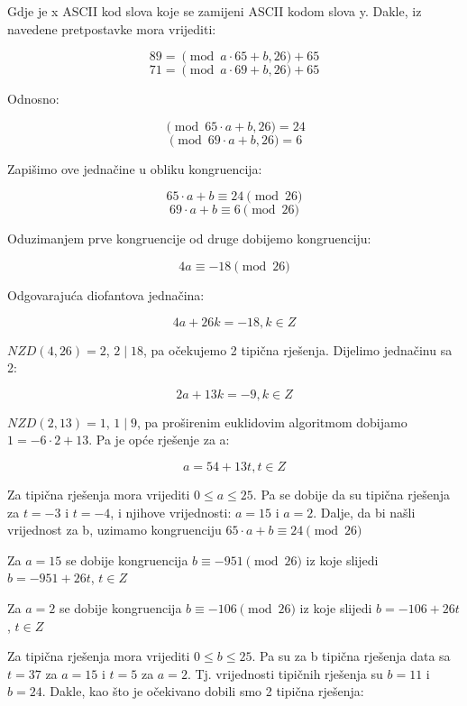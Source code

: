 \documentclass[12pt]{article}
\begin{document}
Gdje je x ASCII kod slova koje se zamijeni ASCII kodom slova y. Dakle, iz navedene pretpostavke mora vrijediti:

$$89 = \pmod{a\cdot65 + b, 26} + 65$$ 
$$71 = \pmod{a\cdot69 + b, 26} + 65$$

Odnosno:

$$\pmod{65\cdot a + b, 26} = 24$$
$$\pmod{69\cdot a + b, 26} = 6$$\vspace{1mm}

Zapišimo ove jednačine u obliku kongruencija:

$$65\cdot a + b \equiv 24 \pmod{26}$$
$$69\cdot a + b \equiv 6 \pmod{26}$$\vspace{1mm}

Oduzimanjem prve kongruencije od druge dobijemo kongruenciju:

$$4a \equiv -18\pmod{26}$$\vspace{1mm}

Odgovarajuća diofantova jednačina:

$$4a + 26k = -18, k \in Z$$\vspace{1mm} 

$NZD(4, 26) = 2$, $2 \mid 18$, pa očekujemo 2 tipična rješenja. Dijelimo jednačinu sa 2:

$$2a + 13k = -9, k \in Z$$\vspace{1mm}

$NZD(2, 13) = 1$, $1 \mid 9$, pa proširenim euklidovim algoritmom dobijamo $1 = -6\cdot 2 + 13$. Pa je opće rješenje za a:

$$a = 54 + 13t, t \in Z$$\vspace{1mm}

Za tipična rješenja mora vrijediti $0 \leq a \leq 25$. Pa se dobije da su tipična rješenja za $t = -3$ i $t = -4$, i njihove vrijednosti: $a = 15$ i $a = 2$.
Dalje, da bi našli vrijednost za b, uzimamo kongruenciju $65\cdot a + b \equiv 24 \pmod{26}$\vspace{1mm}

Za $a = 15$ se dobije kongruencija $b \equiv -951 \pmod{26}$ iz koje slijedi $b = -951 + 26t$, $t \in Z$

Za $a = 2$ se dobije kongruencija $b \equiv -106 \pmod{26}$ iz koje slijedi $b = -106 + 26t$, $t \in Z$\vspace{1mm}

Za tipična rješenja mora vrijediti $0 \leq b \leq 25$. Pa su za b tipična rješenja data sa $t = 37$ za $a = 15$ i $t = 5$ za $a = 2$.  Tj. vrijednosti tipičnih rješenja su $b = 11$ i $b = 24$. Dakle, kao što je očekivano dobili smo 2 tipična rješenja: 
\end{document}
